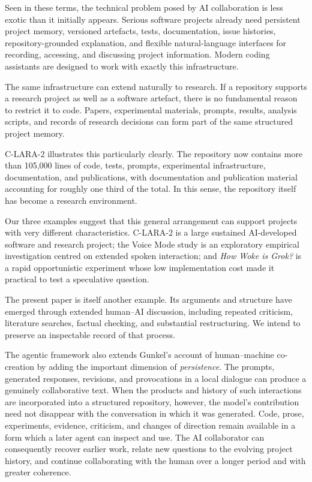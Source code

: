 \documentclass[12pt]{article}
\begin{document}
Seen in these terms, the technical problem posed by AI collaboration is less exotic than it initially appears. Serious software projects already need persistent project memory, versioned artefacts, tests, documentation, issue histories, repository-grounded explanation, and flexible natural-language interfaces for recording, accessing, and discussing project information. Modern coding assistants are designed to work with exactly this infrastructure.

The same infrastructure can extend naturally to research. If a repository supports a research project as well as a software artefact, there is no fundamental reason to restrict it to code. Papers, experimental materials, prompts, results, analysis scripts, and records of research decisions can form part of the same structured project memory.

C-LARA-2 illustrates this particularly clearly. The repository now contains more than 105,000 lines of code, tests, prompts, experimental infrastructure, documentation, and publications, with documentation and publication material accounting for roughly one third of the total. In this sense, the repository itself has become a research environment.

Our three examples suggest that this general arrangement can support projects with very different characteristics. C-LARA-2 is a large sustained AI-developed software and research project; the Voice Mode study is an exploratory empirical investigation centred on extended spoken interaction; and \emph{How Woke is Grok?} is a rapid opportunistic experiment whose low implementation cost made it practical to test a speculative question.

The present paper is itself another example. Its arguments and structure have emerged through extended human--AI discussion, including repeated criticism, literature searches, factual checking, and substantial restructuring. We intend to preserve an inspectable record of that process.

The agentic framework also extends Gunkel's account of human--machine co-creation by adding the important dimension of \emph{persistence}. The prompts, generated responses, revisions, and provocations in a local dialogue can produce a genuinely collaborative text. When the products and history of such interactions are incorporated into a structured repository, however, the model's contribution need not disappear with the conversation in which it was generated. Code, prose, experiments, evidence, criticism, and changes of direction remain available in a form which a later agent can inspect and use. The AI collaborator can consequently recover earlier work, relate new questions to the evolving project history, and continue collaborating with the human over a longer period and with greater coherence.
\end{document}

